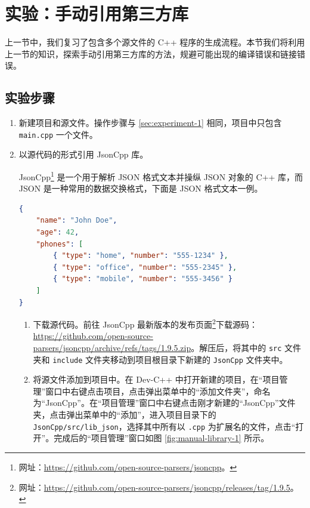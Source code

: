 
\section{实验：手动引用第三方库\label{sec:experiment-2}}

上一节中，我们复习了包含多个源文件的 C++ 程序的生成流程。本节我们将利用上一节的知识，探索手动引用第三方库的方法，规避可能出现的编译错误和链接错误。

\subsection*{实验步骤}

\begin{enumerate}
	\item 新建项目和源文件。操作步骤与 \ref{sec:experiment-1} 相同，项目中只包含 \lstinline[language={}]{main.cpp} 一个文件。

	\item 以源代码的形式引用 JsonCpp 库。

	JsonCpp\footnote{网址：\url{https://github.com/open-source-parsers/jsoncpp}。} 是一个用于解析 JSON 格式文本并操纵 JSON 对象的 C++ 库，而 JSON 是一种常用的数据交换格式，下面是 JSON 格式文本一例。

	\begin{lstlisting}[language={JSON}]
{
	"name": "John Doe",
	"age": 42,
	"phones": [
		{ "type": "home", "number": "555-1234" },
		{ "type": "office", "number": "555-2345" },
		{ "type": "mobile", "number": "555-3456" }
	]
}
	\end{lstlisting}

	\begin{enumerate}
		\item 下载源代码。前往 JsonCpp 最新版本的发布页面\footnote{网址：\url{https://github.com/open-source-parsers/jsoncpp/releases/tag/1.9.5}。}下载源码：\url{https://github.com/open-source-parsers/jsoncpp/archive/refs/tags/1.9.5.zip}。解压后，将其中的 \lstinline[language={}]{src} 文件夹和 \lstinline[language={}]{include} 文件夹移动到项目根目录下新建的 \lstinline[language={}]{JsonCpp} 文件夹中。

		\item 将源文件添加到项目中。在 Dev-C++ 中打开新建的项目，在“项目管理”窗口中右键点击项目，点击弹出菜单中的“添加文件夹”，命名为“JsonCpp”。在“项目管理”窗口中右键点击刚才新建的“JsonCpp”文件夹，点击弹出菜单中的“添加”，进入项目目录下的 \lstinline[language={}]{JsonCpp/src/lib_json}，选择其中所有以 \lstinline[language={}]{.cpp} 为扩展名的文件，点击“打开”。完成后的“项目管理”窗口如图 \ref{fig:manual-library-1} 所示。


\end{enumerate}
\end{enumerate}
